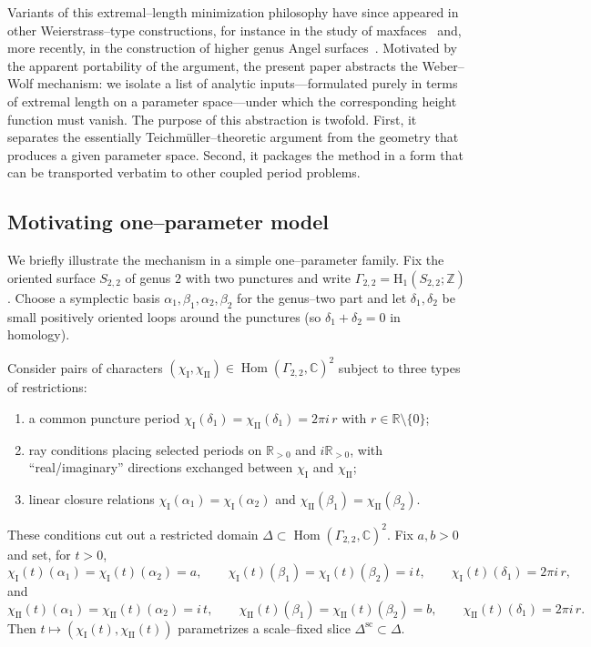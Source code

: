 \documentclass[a4paper,12pt]{amsart}
\newcommand{\C}{\mathbb{C}}
\newcommand{\R}{\mathbb{R}}
\newcommand{\Z}{\mathbb{Z}}
\newcommand{\Hom}{\operatorname{Hom}}
\theoremstyle{plain}
\theoremstyle{definition}
\begin{document}
Variants of this extremal--length minimization philosophy have since appeared in other Weierstrass--type constructions, for instance in the
study of maxfaces~\cite{BardhanBiswasKumarMaxfaces} and, more recently, in the construction of higher genus Angel surfaces~\cite{BardhanBiswasFujimoriKumarAngel}.
Motivated by the apparent portability of the argument, the present paper abstracts the Weber--Wolf mechanism: we isolate a list of analytic
inputs---formulated purely in terms of extremal length on a parameter space---under which the corresponding height function must vanish.
The purpose of this abstraction is twofold.
First, it separates the essentially Teichm\"uller--theoretic argument from the geometry that produces a given parameter space.
Second, it packages the method in a form that can be transported verbatim to other coupled period problems.

\subsection{Motivating one--parameter model}\label{subsec:motivating-example}
We briefly illustrate the mechanism in a simple one--parameter family.
Fix the oriented surface $S_{2,2}$ of genus $2$ with two punctures and write $\Gamma_{2,2}=\mathrm{H}_1(S_{2,2};\Z)$.
Choose a symplectic basis $\alpha_1,\beta_1,\alpha_2,\beta_2$ for the genus--two part and let $\delta_1,\delta_2$ be small
positively oriented loops around the punctures (so $\delta_1+\delta_2=0$ in homology).

Consider pairs of characters $(\chi_{\mathrm{I}},\chi_{\mathrm{II}})\in\Hom(\Gamma_{2,2},\C)^2$ subject to three types of restrictions:
\begin{enumerate}[label=\textnormal{(\roman*)}, itemsep=2pt, topsep=2pt]
\item a common puncture period $\chi_{\mathrm{I}}(\delta_1)=\chi_{\mathrm{II}}(\delta_1)=2\pi i\,r$ with $r\in\R\setminus\{0\}$;
\item ray conditions placing selected periods on $\R_{>0}$ and $i\R_{>0}$, with ``real/imaginary'' directions exchanged
between $\chi_{\mathrm{I}}$ and $\chi_{\mathrm{II}}$;
\item linear closure relations $\chi_{\mathrm{I}}(\alpha_1)=\chi_{\mathrm{I}}(\alpha_2)$ and $\chi_{\mathrm{II}}(\beta_1)=\chi_{\mathrm{II}}(\beta_2)$.
\end{enumerate}
These conditions cut out a restricted domain $\Delta\subset\Hom(\Gamma_{2,2},\C)^2$.
Fix $a,b>0$ and set, for $t>0$,
\[
\chi_{\mathrm{I}}(t)(\alpha_1)=\chi_{\mathrm{I}}(t)(\alpha_2)=a,\qquad
\chi_{\mathrm{I}}(t)(\beta_1)=\chi_{\mathrm{I}}(t)(\beta_2)= i\,t,\qquad
\chi_{\mathrm{I}}(t)(\delta_1)=2\pi i\,r,
\]
and
\[
\chi_{\mathrm{II}}(t)(\alpha_1)=\chi_{\mathrm{II}}(t)(\alpha_2)= i\,t,\qquad
\chi_{\mathrm{II}}(t)(\beta_1)=\chi_{\mathrm{II}}(t)(\beta_2)= b,\qquad
\chi_{\mathrm{II}}(t)(\delta_1)=2\pi i\,r.
\]
Then $t\longmapsto(\chi_{\mathrm{I}}(t),\chi_{\mathrm{II}}(t))$ parametrizes a scale--fixed slice $\Delta^{\mathrm{sc}}\subset\Delta$.
\end{document}
